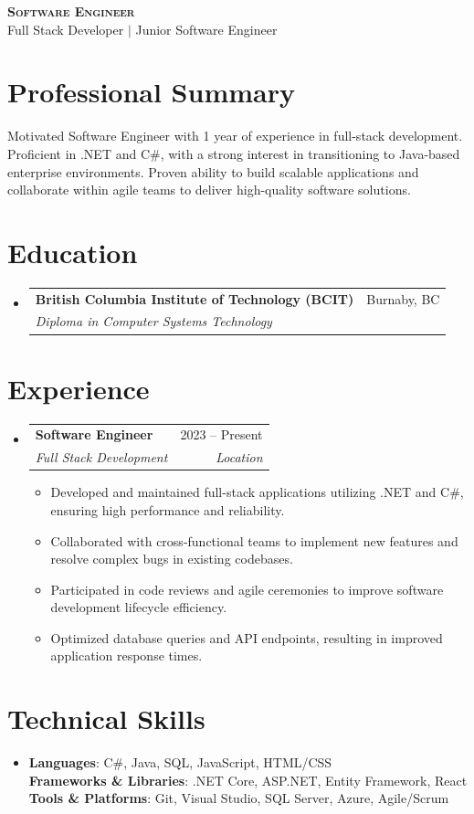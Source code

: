 \documentclass[letterpaper,11pt]{article}
\makeatletter
\newcommand{\resumeItem}[1]{
\item\small{
{#1 \vspace{-2pt}}
}
}
\newcommand{\resumeSubheading}[4]{
\vspace{-2pt}\item
\begin{tabular*}{0.97\textwidth}[t]{l@{\extracolsep{\fill}}r}
\textbf{#1} & #2 \\
\textit{\small#3} & \textit{\small #4} \\
\end{tabular*}\vspace{-7pt}
}
\newcommand{\resumeSubHeadingListStart}{\begin{itemize}[leftmargin=0.15in, label={}]}
\newcommand{\resumeSubHeadingListEnd}{\end{itemize}}
\newcommand{\resumeItemListStart}{\begin{itemize}}
\newcommand{\resumeItemListEnd}{\end{itemize}\vspace{-5pt}}
\makeatother
\begin{document}
\begin{center}
\textbf{\Huge \scshape Software Engineer} \\ \vspace{1pt}
\small Full Stack Developer $|$ Junior Software Engineer
\end{center}

\section{Professional Summary}
Motivated Software Engineer with 1 year of experience in full-stack development. Proficient in .NET and C\#, with a strong interest in transitioning to Java-based enterprise environments. Proven ability to build scalable applications and collaborate within agile teams to deliver high-quality software solutions.

\section{Education}
\resumeSubHeadingListStart
\resumeSubheading{British Columbia Institute of Technology (BCIT)}{Burnaby, BC}{Diploma in Computer Systems Technology}{}
\resumeSubHeadingListEnd

\section{Experience}
\resumeSubHeadingListStart
\resumeSubheading{Software Engineer}{2023 -- Present}{Full Stack Development}{Location}
\resumeItemListStart
\resumeItem{Developed and maintained full-stack applications utilizing .NET and C\#, ensuring high performance and reliability.}
\resumeItem{Collaborated with cross-functional teams to implement new features and resolve complex bugs in existing codebases.}
\resumeItem{Participated in code reviews and agile ceremonies to improve software development lifecycle efficiency.}
\resumeItem{Optimized database queries and API endpoints, resulting in improved application response times.}
\resumeItemListEnd
\resumeSubHeadingListEnd

\section{Technical Skills}
\begin{itemize}[leftmargin=0.15in, label={}]
\item{
\textbf{Languages}{: C\#, Java, SQL, JavaScript, HTML/CSS} \\
\textbf{Frameworks \& Libraries}{: .NET Core, ASP.NET, Entity Framework, React} \\
\textbf{Tools \& Platforms}{: Git, Visual Studio, SQL Server, Azure, Agile/Scrum}
}
\end{itemize}
\end{document}
